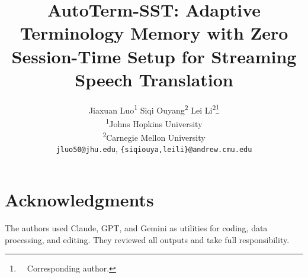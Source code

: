 \documentclass[11pt]{article}
\title{AutoTerm-SST: Adaptive Terminology Memory with Zero Session-Time Setup for Streaming Speech Translation}
\author{
  Jiaxuan Luo\textsuperscript{1} \quad
  Siqi Ouyang\textsuperscript{2} \quad
  Lei Li\textsuperscript{2}\thanks{\ \ Corresponding author.} \\
  \textsuperscript{1}Johns Hopkins University \\
  \textsuperscript{2}Carnegie Mellon University \\
  \texttt{jluo50@jhu.edu}, \texttt{\{siqiouya,leili\}@andrew.cmu.edu}
}
\begin{document}
\maketitle










\section*{Acknowledgments}
The authors used Claude, GPT, and Gemini as utilities for coding, data
processing, and editing. They reviewed all outputs and take full responsibility.



\clearpage

\end{document}
